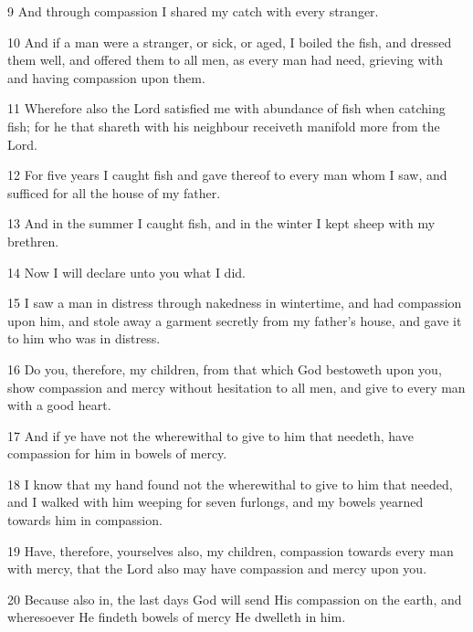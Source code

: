\par 9 And through compassion I shared my catch with every stranger.

\par 10 And if a man were a stranger, or sick, or aged, I boiled the fish, and dressed them well, and offered them to all men, as every man had need, grieving with and having compassion upon them.

\par 11 Wherefore also the Lord satisfied me with abundance of fish when catching fish; for he that shareth with his neighbour receiveth manifold more from the Lord.

\par 12 For five years I caught fish and gave thereof to every man whom I saw, and sufficed for all the house of my father.

\par 13 And in the summer I caught fish, and in the winter I kept sheep with my brethren.

\par 14 Now I will declare unto you what I did.

\par 15 I saw a man in distress through nakedness in wintertime, and had compassion upon him, and stole away a garment secretly from my father's house, and gave it to him who was in distress.

\par 16 Do you, therefore, my children, from that which God bestoweth upon you, show compassion and mercy without hesitation to all men, and give to every man with a good heart.

\par 17 And if ye have not the wherewithal to give to him that needeth, have compassion for him in bowels of mercy.

\par 18 I know that my hand found not the wherewithal to give to him that needed, and I walked with him weeping for seven furlongs, and my bowels yearned towards him in compassion.

\par 19 Have, therefore, yourselves also, my children, compassion towards every man with mercy, that the Lord also may have compassion and mercy upon you.

\par 20 Because also in, the last days God will send His compassion on the earth, and wheresoever He findeth bowels of mercy He dwelleth in him.

